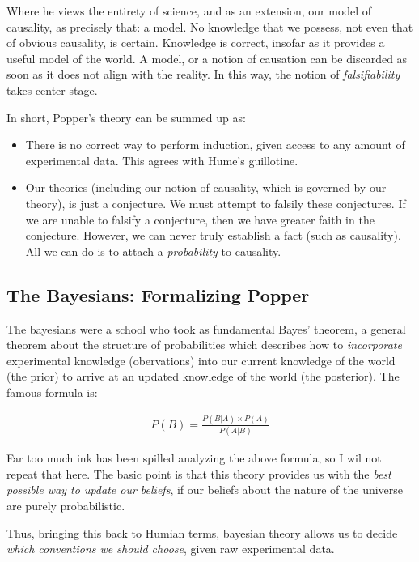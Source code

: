 \documentclass{article}
\begin{document}
Where he views the entirety of science, and as an extension, our model of
causality, as precisely that: a model. No knowledge that we possess, not even
that of obvious causality, is certain. Knowledge is correct, insofar as it
provides a useful model of the world. A model, or a notion of causation can be
discarded as soon as it does not align with the reality. In this way, the
notion of \emph{falsifiability} takes center stage.

In short, Popper's theory can be summed up as:
\begin{itemize}
    \item There is no correct way to perform induction, given access to any amount
        of experimental data. This agrees with Hume's guillotine.
    \item Our theories (including our notion of causality, which is governed by our theory), is
        just a conjecture. We must attempt to falsily these conjectures. If we
        are unable to falsify a conjecture, then we have greater faith in the conjecture. However,
        we can never truly establish a fact (such as causality). All we can do
        is to attach a \emph{probability} to causality.
\end{itemize}


\subsection{The Bayesians: Formalizing Popper} 
The bayesians were a school who took as fundamental Bayes' theorem, a general
theorem about the structure of probabilities which describes how to \emph{incorporate}
experimental knowledge (obervations) into our current knowledge of the world (the prior)
to arrive at an updated knowledge of the world (the posterior). The famous formula is:

\begin{align*}
    P(B) = \frac{P(B|A) \times P(A) }{P(A|B)}
\end{align*}

Far too much ink has been spilled analyzing the above formula, so I wil not
repeat that here. The basic point is that this theory provides us with the
\textit{best possible way to update our beliefs}, if our beliefs about the
nature of the universe are purely probabilistic.

Thus, bringing this back to Humian terms, bayesian theory allows us to decide
\textit{which conventions we should choose}, given raw experimental data.
\end{document}
